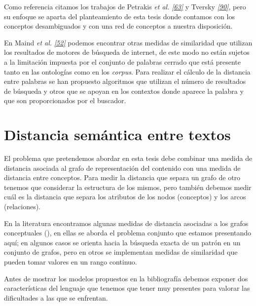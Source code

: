 \documentclass[a4paper,12pt,spanish]{book}
\begin{document}
Como referencia citamos los trabajos de Petrakis \emph{et al.} \label{1.state-of-the-art/ii.medidas-distancia:id49}{\hyperref[zreferences:petrakis2006]{\emph{{[}63{]}}}} y
Tversky \label{1.state-of-the-art/ii.medidas-distancia:id50}{\hyperref[zreferences:tversky1977]{\emph{{[}90{]}}}}, pero su enfoque se aparta del planteamiento de esta tesis
donde contamos con los conceptos desambiguados y con una red de conceptos a nuestra
disposición.

En Maind \emph{et al.} \label{1.state-of-the-art/ii.medidas-distancia:id51}{\hyperref[zreferences:maind2012]{\emph{{[}52{]}}}} podemos encontrar otras medidas de similaridad que
utilizan los resultados de motores de búsqueda de internet, de este modo no están sujetos
a la limitación impuesta por el conjunto de palabras cerrado que está presente tanto en
las ontologías como en los \emph{corpus}. Para realizar el cálculo de la distancia entre
palabras se han propuesto algoritmos que utilizan el número de resultados de búsqueda y
otros que se apoyan en los contextos donde aparece la palabra y que son proporcionados
por el buscador.


\section{Distancia semántica entre textos}
\label{1.state-of-the-art/iii.distancia-semantica:distancia-semantica-entre-textos}\label{1.state-of-the-art/iii.distancia-semantica::doc}
El problema que pretendemos abordar en esta tesis debe combinar una medida de distancia
asociada al grafo de representación del contenido con una medida de distancia entre
conceptos. Para medir la distancia que separa un grafo de otro tenemos que considerar la
estructura de los mismos, pero también debemos medir cuál es la distancia que separa los
atributos de los nodos (conceptos) y los arcos (relaciones).

En la literatura encontramos algunas medidas de distancia asociadas a los grafos conceptuales
({\hyperref[1.state-of-the-art/i.representacion-conocimiento:grafos-conceptuales]{\emph{}}}), en ellas se aborda el problema conjunto que estamos
presentando aquí; en algunos casos se orienta hacia la búsqueda exacta de un patrón en un
conjunto de grafos, pero en otros se implementan medidas de similaridad que pueden tomar
valores en un rango continuo.

Antes de mostrar los modelos propuestos en la bibliografía debemos exponer dos
características del lenguaje que tenemos que tener muy presentes para valorar las
dificultades a las que se enfrentan.
\end{document}
